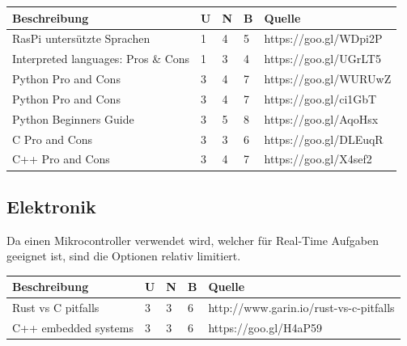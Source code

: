 \documentclass[a4paper]{report}
\begin{document}
\vspace{1em}
\noindent
\begin{tabular}{|p{}|p{}|p{}|p{}|p{}|}
	\hline
	\textbf{Beschreibung} & \textbf{U} & \textbf{N} & \textbf{B} & \textbf{Quelle} \\
	\hline
	RasPi untersützte Sprachen & 1 & 4 & 5 & https://goo.gl/WDpi2P \\
	\hline
	Interpreted languages: Pros \& Cons & 1 & 3 & 4 & https://goo.gl/UGrLT5 \\
	\hline
	Python Pro and Cons & 3 & 4  & 7 & https://goo.gl/WURUwZ \\
	\hline
	Python Pro and Cons & 3 & 4 & 7 & https://goo.gl/ci1GbT \\
	\hline
	Python Beginners Guide & 3 & 5 & 8 & https://goo.gl/AqoHsx\\
	\hline
	C Pro and Cons & 3 & 3 & 6 & https://goo.gl/DLEuqR \\
	\hline
	C++ Pro and Cons & 3 & 4 & 7 & https://goo.gl/X4sef2\\
	\hline
\end{tabular}

\subsection{Elektronik}
\label{app:ssec:PrgET}
Da einen Mikrocontroller verwendet wird, welcher für Real-Time Aufgaben
geeignet ist, sind die Optionen relativ limitiert.

\vspace{1em}
\noindent
\begin{tabular}{|p{}|p{}|p{}|p{}|p{}|}
	\hline
	\textbf{Beschreibung} & \textbf{U} & \textbf{N} & \textbf{B} & \textbf{Quelle} \\
	\hline
  Rust vs C pitfalls & 3 & 3 & 6 & http://www.garin.io/rust-vs-c-pitfalls \\
  \hline
  C++ embedded systems & 3 & 3 & 6 & https://goo.gl/H4aP59 \\
	\hline
\end{tabular}
\end{document}
